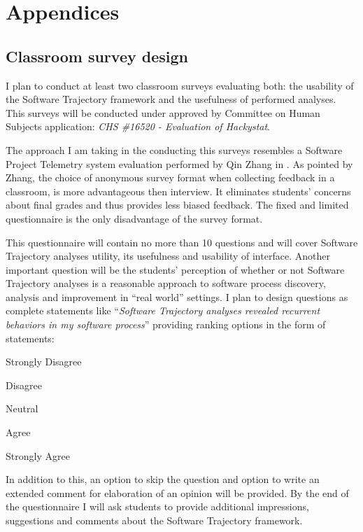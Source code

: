 \chapter{Appendices} \label{appendix}

\section{Classroom survey design} \label{survey}
I plan to conduct at least two classroom surveys evaluating both: the usability of the Software Trajectory framework and the usefulness of performed analyses. This surveys will be conducted under approved by Committee on Human Subjects application: \textit{CHS \#16520 - Evaluation of Hackystat}.

The approach I am taking in the conducting this surveys resembles a Software Project Telemetry system evaluation performed by Qin Zhang in \cite{csdl2-06-05}. As pointed by Zhang, the choice of anonymous survey format when collecting feedback in a classroom, is more advantageous then interview. It eliminates students' concerns about final grades and thus provides less biased feedback. The fixed and limited questionnaire is the only disadvantage of the survey format. 

This questionnaire will contain no more than 10 questions and will cover Software Trajectory analyses utility, its usefulness and usability of interface. Another important question will be the students' perception of whether or not Software Trajectory analyses is a reasonable approach to software process discovery, analysis and improvement in ``real world'' settings. I plan to design questions as complete statements like ``\textit{Software Trajectory analyses revealed recurrent behaviors in my software process}'' providing ranking options in the form of statements:
\begin{itemize*}
	\item Strongly Disagree
	\item Disagree
	\item Neutral
	\item Agree
	\item Strongly Agree
\end{itemize*}
In addition to this, an option to skip the question and option to write an extended comment for elaboration of an opinion will be provided. By the end of the questionnaire I will ask students to provide additional impressions, suggestions and comments about the Software Trajectory framework. 

